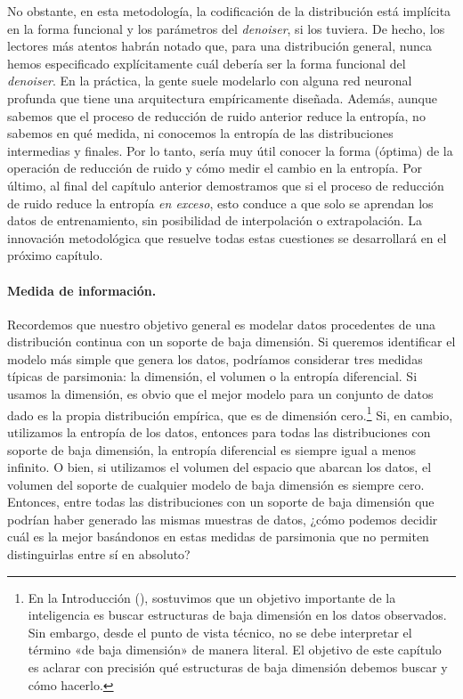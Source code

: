 \documentclass[../../book-main.tex]{subfiles}
\begin{document}
No obstante, en esta metodología, la
codificación de la distribución está implícita en la forma funcional
y los parámetros del \textit{denoiser}, si los tuviera. De hecho, los lectores más atentos habrán
notado que, para una distribución general, nunca hemos
especificado explícitamente cuál debería ser la forma funcional del \textit{denoiser}. En la práctica,
la gente suele modelarlo con alguna red neuronal profunda que tiene una
arquitectura empíricamente diseñada. Además, aunque sabemos que el
proceso de reducción de ruido anterior reduce la entropía, no sabemos en qué
medida, ni conocemos la entropía de las distribuciones intermedias y finales.
Por lo tanto, sería muy útil conocer la forma (óptima)
de la operación de reducción de ruido y cómo medir el cambio en
la entropía. Por último, al final del capítulo anterior demostramos que si
el proceso de reducción de ruido reduce la entropía \textit{en exceso}, esto conduce
a que solo se aprendan los datos de entrenamiento, sin posibilidad de interpolación o
extrapolación. La innovación metodológica que resuelve todas
estas cuestiones se desarrollará en el próximo capítulo.

\paragraph{Medida de información.}
Recordemos que nuestro objetivo general es modelar datos procedentes de una distribución continua
con un soporte de baja dimensión. Si queremos identificar el
modelo más simple que genera los datos, podríamos considerar tres
medidas típicas de parsimonia: la dimensión, el volumen o la
entropía diferencial. Si usamos la dimensión, es obvio que el mejor modelo para un
conjunto de datos dado es la propia distribución empírica, que es
de dimensión cero.\footnote{En la Introducción
    (), sostuvimos que un objetivo importante de la inteligencia es
    buscar estructuras de baja dimensión en los datos observados. Sin embargo,
    desde el punto de vista técnico, no se debe interpretar el término
    «de baja dimensión» de manera literal. El objetivo de este capítulo es
    aclarar con precisión qué estructuras de baja dimensión debemos
buscar y cómo hacerlo.} Si, en cambio, utilizamos la entropía de los datos, entonces
para todas las distribuciones con soporte de baja dimensión, la entropía diferencial
es siempre igual a menos infinito. O bien, si utilizamos el volumen del
espacio que abarcan los datos, el volumen del soporte de cualquier
modelo de baja dimensión es siempre cero. Entonces, entre todas las distribuciones con
un soporte de baja dimensión que podrían haber generado las mismas
muestras de datos, ¿cómo podemos decidir cuál es la mejor basándonos en estas
medidas de parsimonia que no permiten distinguirlas entre sí en absoluto?
\end{document}

